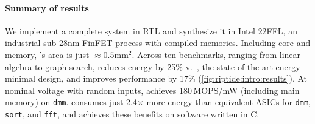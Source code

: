   
  
  

\figRipTideIntroResults
\paragraph{Summary of results}
%
We implement a complete \riptide system in RTL and synthesize it in
Intel 22FFL, an industrial sub-28nm FinFET process with compiled memories.
%
Including core and memory, \riptide's area is just $\approx 0.5$mm$^2$.
%
Across ten benchmarks,
ranging from linear algebra to graph search, %
\riptide reduces energy by 25\% v.\ \snafu, the state-of-the-art energy-minimal design,
and improves performance by 17\% (\autoref{fig:riptide:intro:results}).
%
At nominal voltage with random inputs, \riptide achieves 180\,MOPS/mW (including main memory) on {\tt dmm}.
%
\riptide consumes just 2.4$\times$ more energy
than equivalent ASICs for {\tt dmm}, {\tt sort}, and {\tt fft},
%
and \riptide achieves these benefits on software written in C.


